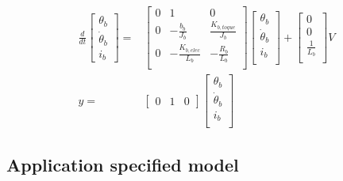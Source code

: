 \documentclass[../../main]{subfiles}
\begin{document}
\begin{equation}
      \label{eq:ss_buttomframe}
      \begin{split}
      \frac{d}{dt}
    \begin{bmatrix}
        \theta_b \\
        \dot \theta_b \\
        i_b
    \end{bmatrix}
    =&
    \begin{bmatrix}
        0 & 1               & 0             \\
        0 & -\frac{b_b}{J_b}    & \frac{K_{b,toque}}{J_b} \\
        0 & -\frac{K_{b,elec}}{L_b}  & -\frac{R_b}{L_b}  \\
    \end{bmatrix}
    \begin{bmatrix}
        \theta_b \\
        \dot \theta_b \\
        i_b \\
    \end{bmatrix}
    +
    \begin{bmatrix}
        0 \\
        0 \\
        \frac{1}{L_b} \\
    \end{bmatrix}
    V
\\
      y =&
    \begin{bmatrix}
        0 & 1 & 0
    \end{bmatrix}
    \begin{bmatrix}
        \theta_b \\
        \dot \theta_b\\
        i_b\\
    \end{bmatrix}
  \end{split}
\end{equation}


\subsection{Application specified model}
\end{document}
